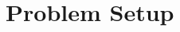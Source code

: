 \documentclass[11pt]{article}
\begin{document}






\section{Problem Setup}
\label{sec:setup}
\end{document}
